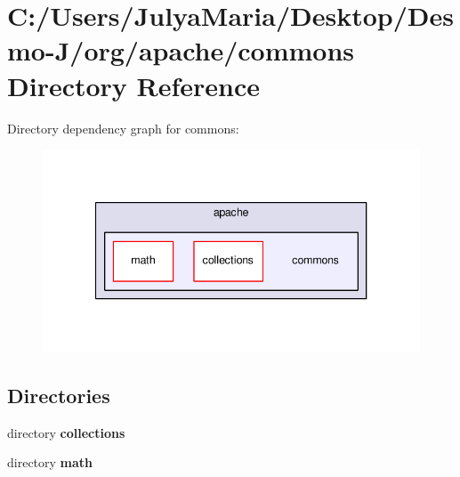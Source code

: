 \section{C\-:/\-Users/\-Julya\-Maria/\-Desktop/\-Desmo-\/\-J/org/apache/commons Directory Reference}
\label{dir_a2f27da8142e981394b62a64d46c6ac2}
Directory dependency graph for commons\-:
\nopagebreak
\begin{figure}[H]
\begin{center}
\leavevmode
\includegraphics[width=341pt]{dir_a2f27da8142e981394b62a64d46c6ac2_dep}
\end{center}
\end{figure}
\subsection*{Directories}
\begin{DoxyCompactItemize}
\item 
directory {\bf collections}
\item 
directory {\bf math}
\end{DoxyCompactItemize}
